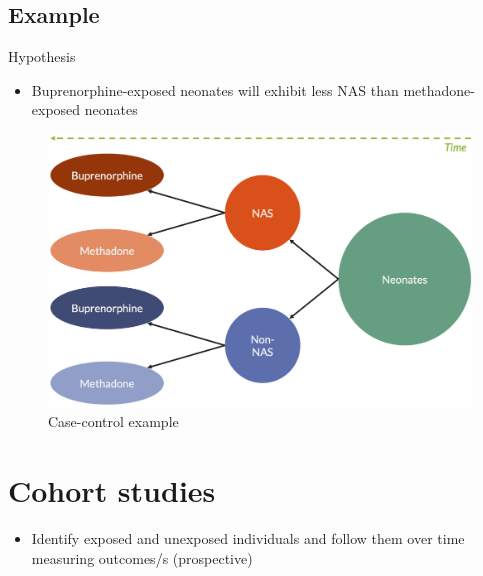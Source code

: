 \documentclass[
]{book}
\providecommand{\tightlist}{%
  \setlength{\itemsep}{0pt}\setlength{\parskip}{0pt}}
\begin{document}
\hypertarget{example-1}{%
\subsection{Example}\label{example-1}}

Hypothesis

\begin{itemize}
\tightlist
\item
  Buprenorphine-exposed neonates will exhibit less NAS than methadone-exposed neonates
\end{itemize}

\begin{figure}

{\centering \includegraphics[width=1\linewidth]{img/study_design/case_control_example} 

}

\caption{Case-control example}\label{fig:unnamed-chunk-5}
\end{figure}

\hypertarget{cohort-studies}{%
\section{Cohort studies}\label{cohort-studies}}

\begin{itemize}
\tightlist
\item
  Identify exposed and unexposed individuals and follow them over time measuring outcomes/s (prospective)
\end{itemize}
\end{document}
